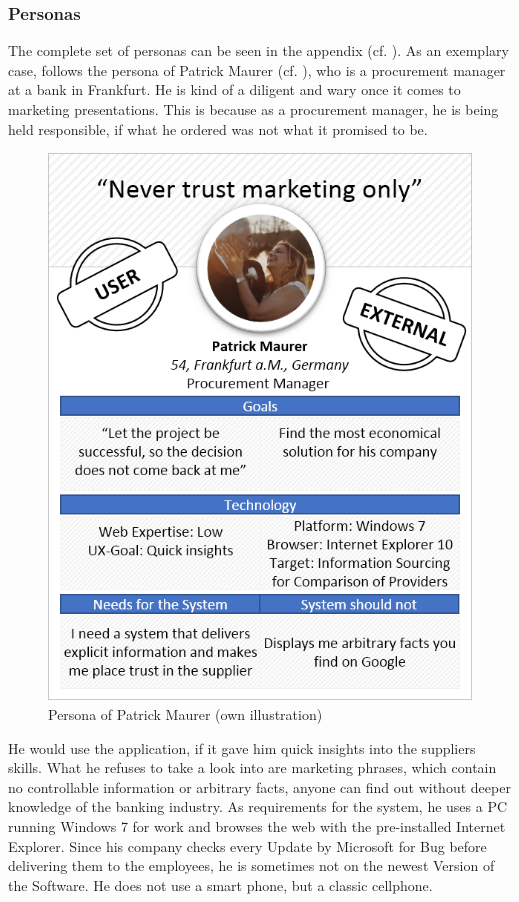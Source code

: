 \subsubsection{Personas}
The complete set of personas can be seen in the appendix (cf. \cpagerefrange{}{}). As an exemplary case, follows the persona of Patrick Maurer (cf. ), who is a procurement manager at a bank in Frankfurt. He is kind of a diligent and wary once it comes to marketing presentations. This is because as a procurement manager, he is being held responsible, if what he ordered was not what it promised to be. 

\begin{figure}[H]
    \centering
    \includegraphics[height=.5\textheight]{img/diagrams/personas/customer1.png}
    \caption[Persona of Patrick Maurer]{Persona of Patrick Maurer (own illustration)}
    \label{fig:PatrickMaurer}
\end{figure}

He would use the application, if it gave him quick insights into the suppliers skills. What he refuses to take a look into are marketing phrases, which contain no controllable information or arbitrary facts, anyone can find out without deeper knowledge of the banking industry. As requirements for the system, he uses a PC running Windows 7 for work and browses the web with the pre-installed Internet Explorer. Since his company checks every Update by Microsoft for Bug before delivering them to the employees, he is sometimes not on the newest Version of the Software. He does not use a smart phone, but a classic cellphone.

